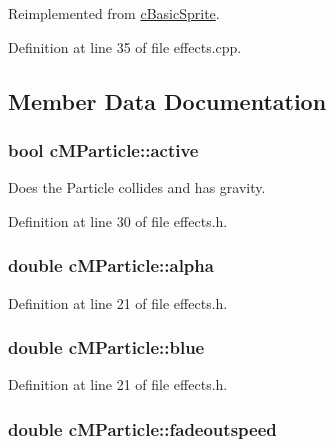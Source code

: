 Reimplemented from \hyperlink{classc_basic_sprite_a6f01984a6af849dc95cc9ec1f3528074}{c\-Basic\-Sprite}.



Definition at line 35 of file effects.\-cpp.



\subsection{Member Data Documentation}
\hypertarget{classc_m_particle_a08fb4f55e8af895d93501ec009bb138c}{
\subsubsection[{active}]{\setlength{\rightskip}{0pt plus 5cm}bool c\-M\-Particle\-::active}}\label{classc_m_particle_a08fb4f55e8af895d93501ec009bb138c}


Does the Particle collides and has gravity. 



Definition at line 30 of file effects.\-h.

\hypertarget{classc_m_particle_abe1351cba41b5c22228f57634bb91c94}{
\subsubsection[{alpha}]{\setlength{\rightskip}{0pt plus 5cm}double c\-M\-Particle\-::alpha}}\label{classc_m_particle_abe1351cba41b5c22228f57634bb91c94}


Definition at line 21 of file effects.\-h.

\hypertarget{classc_m_particle_a33cefdbb5990e03af063388f34c64f1d}{
\subsubsection[{blue}]{\setlength{\rightskip}{0pt plus 5cm}double c\-M\-Particle\-::blue}}\label{classc_m_particle_a33cefdbb5990e03af063388f34c64f1d}


Definition at line 21 of file effects.\-h.

\hypertarget{classc_m_particle_a6c9e380fd94779a7494c217096751156}{
\subsubsection[{fadeoutspeed}]{\setlength{\rightskip}{0pt plus 5cm}double c\-M\-Particle\-::fadeoutspeed}}\label{classc_m_particle_a6c9e380fd94779a7494c217096751156}


